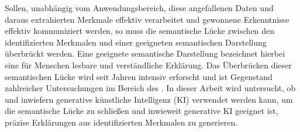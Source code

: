 \noindent
Sollen, unabhängig vom Anwendungsbereich, diese angefallenen Daten und daraus extrahierten Merkmale effektiv verarbeitet und gewonnene Erkenntnisse effektiv kommuniziert werden, so muss die semantische Lücke zwischen den identifizierten Merkmalen und einer geeigneten semantischen Darstellung überbrückt werden.
Eine geeignete semantische Darstellung bezeichnet hierbei eine für Menschen lesbare und verständliche Erklärung.
Das Überbrücken dieser semantischen Lücke wird seit Jahren intensiv erforscht und ist Gegenstand zahlreicher Untersuchungen im Bereich des \mmiri{}.
In dieser Arbeit wird untersucht, ob und inwiefern generative künstliche Intelligenz (KI) verwendet werden kann, um die semantische Lücke zu schließen und inwieweit generative KI geeignet ist, präzise Erklärungen aus identifizierten Merkmalen zu generieren.

